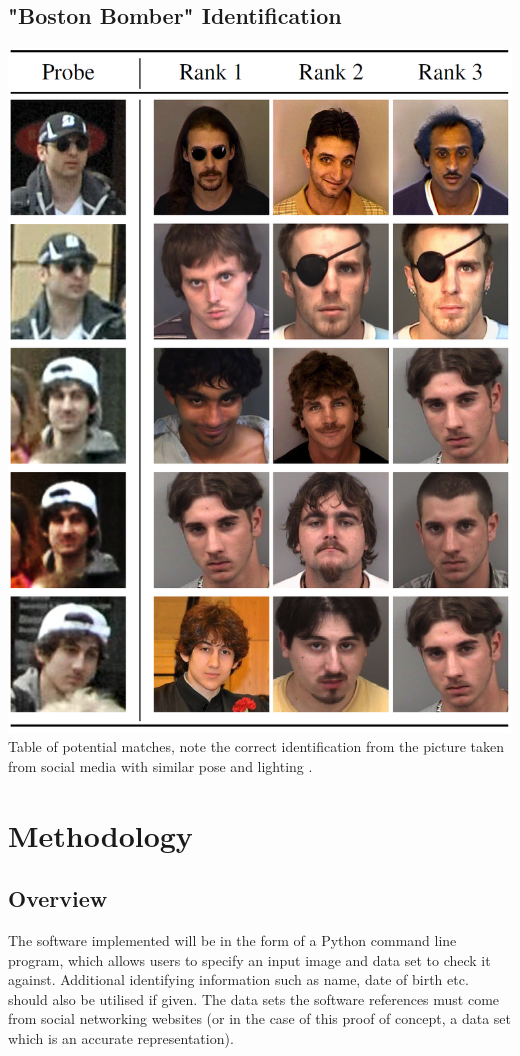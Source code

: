 \documentclass{article}
\begin{document}
\begin{appendices}
\section{"Boston Bomber" Identification}
\label{appendix:bostonbomber}
\includegraphics[width=\linewidth]{res/boston_bomber.png}
Table of potential matches, note the correct identification from the picture taken from social media with similar pose and lighting \citep{bostonbombingcasestudy}.

\end{appendices}

\newpage
\section{Methodology}
\subsection{Overview}
The software implemented will be in the form of a Python command line program, which allows users to specify an input image and data set to check it against. Additional identifying information such as name, date of birth etc. should also be utilised if given. The data sets the software references must come from social networking websites (or in the case of this proof of concept, a data set which is an accurate representation). 
\end{document}
